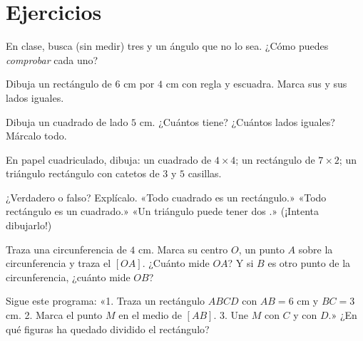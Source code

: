 \section{Ejercicios}

\begin{exercise}[$\star$]\label{exo:g3:shapes:1}
En clase, busca (sin medir) tres  y
un ángulo que no lo sea. ¿Cómo puedes \emph{comprobar} cada uno?
\end{exercise}

\begin{exercise}[$\star$]\label{exo:g3:shapes:2}
Dibuja un rectángulo de $6$ cm por $4$ cm con regla y escuadra. Marca
sus  y sus lados iguales.
\end{exercise}

\begin{exercise}[$\star$]\label{exo:g3:shapes:3}
Dibuja un cuadrado de lado $5$ cm. ¿Cuántos  tiene?
¿Cuántos lados iguales? Márcalo todo.
\end{exercise}

\begin{exercise}[$\star$]\label{exo:g3:shapes:4}
En papel cuadriculado, dibuja: un cuadrado de $4 \times 4$; un rectángulo de
$7 \times 2$; un triángulo rectángulo con catetos de $3$ y $5$ casillas.
\end{exercise}

\begin{exercise}[$\star$]\label{exo:g3:shapes:5}
¿Verdadero o falso? Explícalo.
«Todo cuadrado es un rectángulo.» \quad
«Todo rectángulo es un cuadrado.» \quad
«Un triángulo puede tener dos .» (¡Intenta dibujarlo!)
\end{exercise}

\begin{exercise}[$\star$]\label{exo:g3:shapes:6}
Traza una circunferencia de  $4$ cm. Marca su centro $O$, un punto $A$ sobre
la circunferencia y traza el  $[OA]$. ¿Cuánto mide $OA$? Y si $B$
es otro punto de la circunferencia, ¿cuánto mide $OB$?
\end{exercise}

\begin{exercise}[$\star$]\label{exo:g3:shapes:7}
Sigue este programa: «1. Traza un rectángulo $ABCD$ con $AB = 6$ cm
y $BC = 3$ cm. 2. Marca el punto $M$ en el medio de $[AB]$.
3. Une $M$ con $C$ y con $D$.» ¿En qué figuras ha quedado dividido
el rectángulo?
\end{exercise}

